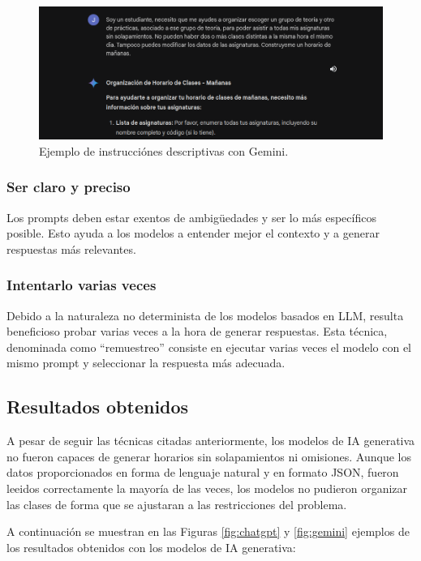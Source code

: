 \begin{figure}[H]
    \centering
    \includegraphics[width=1\textwidth]{./imagenes/Gemini_contexto.png}
    \caption{Ejemplo de instrucciónes descriptivas con Gemini.}
    \label{fig:contexto}
\end{figure}


\subsubsection*{Ser claro y preciso}
Los prompts deben estar exentos de ambigüedades y ser lo más específicos posible. Esto ayuda a los modelos a entender mejor el contexto y a generar respuestas más relevantes.

\subsubsection*{Intentarlo varias veces}
Debido a la naturaleza no determinista de los modelos basados en LLM, resulta beneficioso probar varias veces a la hora de generar respuestas. Esta técnica, denominada como ``remuestreo'' consiste en ejecutar varias veces el modelo con el mismo prompt y seleccionar la respuesta más adecuada.

\subsection{Resultados obtenidos}

A pesar de seguir las técnicas citadas anteriormente, los modelos de IA generativa no fueron capaces de generar horarios sin solapamientos ni omisiones. Aunque los datos proporcionados en forma de lenguaje natural y en formato JSON, fueron leeidos correctamente la mayoría de las veces, los modelos no pudieron organizar las clases de forma que se ajustaran a las restricciones del problema.\newline

A continuación se muestran en las Figuras \ref{fig:chatgpt} y \ref{fig:gemini} ejemplos de los resultados obtenidos con los modelos de IA generativa:

